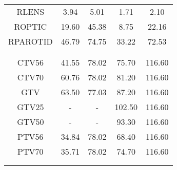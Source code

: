\begin{sidewaystable}[p]
{\begin{tabular}{ccccc}
RLENS & 3.94 & 5.01 & 1.71 & 2.10 \\
ROPTIC & 19.60 & 45.38 & 8.75 & 22.16 \\
RPAROTID & 46.79 & 74.75 & 33.22 & 72.53 \\\\
\midrule\\     
CTV56 & 41.55 & 78.02 & 75.70 & 116.60 \\
CTV70 & 60.76 & 78.02 & 81.20 & 116.60 \\
GTV & 63.50 & 77.03 & 87.20 & 116.60 \\
GTV25 & - & - & 102.50 & 116.60 \\
GTV50 & - & - & 93.30 & 116.60 \\
PTV56 & 34.84 & 78.02 & 68.40 & 116.60 \\
PTV70 & 35.71 & 78.02 & 74.70 & 116.60 \\\\
 \bottomrule\\
 \end{tabular}
}
\end{sidewaystable}


